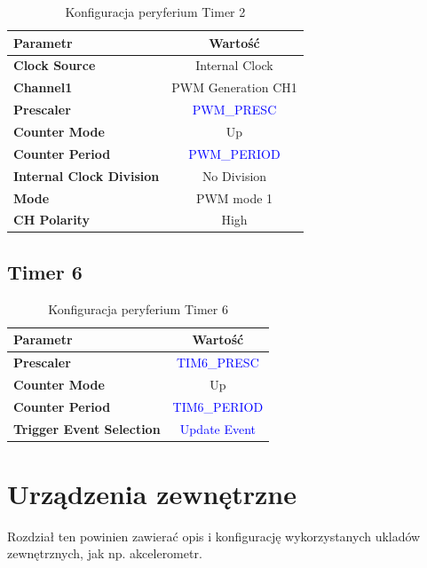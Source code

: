 \documentclass[10pt, a4paper]{article}
\begin{document}
\begin{table}[H]
	\centering
	\begin{tabular}{|l|c|} \hline
		\textbf{Parametr} & Wartość \\
		\hline
		\hline  \textbf{Clock Source}&Internal Clock  \\\hline
		\textbf{Channel1} & PWM Generation CH1\\\hline
		\textbf{Prescaler} & \textcolor{blue}{PWM\_PRESC}\\\hline
		\textbf{Counter Mode} &  Up\\
		\hline
		\textbf{Counter Period}& \textcolor{blue}{PWM\_PERIOD}\\\hline
		\textbf{Internal Clock Division}& No Division\\
		\hline
		\textbf{Mode}& PWM mode 1\\
		\hline
		\textbf{CH Polarity}& High\\
		\hline
	\end{tabular}
	\caption{Konfiguracja peryferium Timer 2}
	\label{tab:Timer2}
\end{table}

\subsection{Timer 6}

\begin{table}[H]
	\centering
	\begin{tabular}{|l|c|} \hline
		\textbf{Parametr} & Wartość \\
		\hline
		\hline
		\textbf{Prescaler} & \textcolor{blue}{TIM6\_PRESC}\\\hline
		\textbf{Counter Mode} &  Up\\
		\hline
		\textbf{Counter Period}& \textcolor{blue}{TIM6\_PERIOD}\\\hline
		\textbf{Trigger Event Selection}& \textcolor{blue}{Update Event}\\
		\hline
	\end{tabular}
	\caption{Konfiguracja peryferium Timer 6}
	\label{tab:Timer6}
\end{table}
\section{Urządzenia zewnętrzne}

Rozdział ten powinien zawierać opis i konfigurację wykorzystanych ukladów
zewnętrznych, jak np. akcelerometr.
\end{document}
